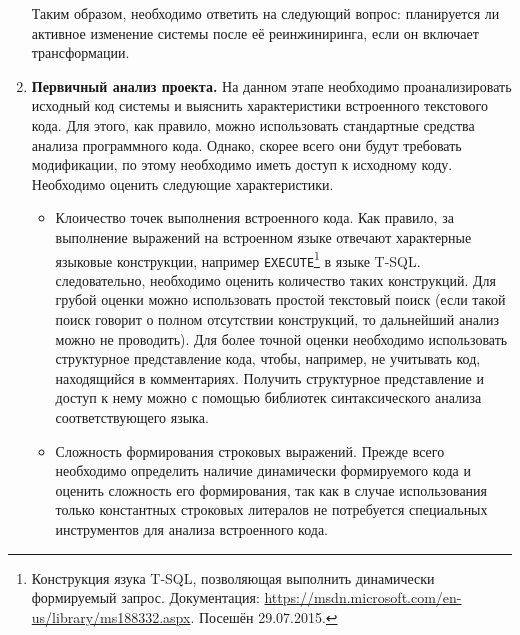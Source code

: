 \begin{enumerate}
  Таким образом, необходимо ответить на следующий вопрос: планируется ли активное изменение системы после её реинжиниринга, если он включает трансформации.
  
  \item \textbf{Первичный анализ проекта.} На данном этапе необходимо проанализировать исходный код системы и выяснить характеристики встроенного текстового кода. Для этого, как правило, можно использовать стандартные средства анализа программного кода. Однако, скорее всего они будут требовать модификации, по этому необходимо иметь доступ к исходному коду. Необходимо оценить следующие характеристики.
  \begin{itemize}
    \item Клоичество точек выполнения встроенного кода. Как правило, за выполнение выражений на встроенном языке отвечают характерные языковые конструкции, например \verb|EXECUTE|\footnote{Конструкция язука T-SQL, позволяющая выполнить динамически формируемый запрос. Документация: \url{https://msdn.microsoft.com/en-us/library/ms188332.aspx}. Посешён 29.07.2015.} в языке T-SQL. следовательно, необходимо оценить количество таких конструкций. Для грубой оценки можно использовать простой текстовый поиск (если такой поиск говорит о полном отсутствии конструкций, то дальнейший анализ можно не проводить). Для более точной оценки необходимо использовать структурное представление кода, чтобы, например, не учитывать код, находящийся в комментариях. Получить структурное представление и доступ к нему можно с помощью библиотек синтаксического анализа соответствующего языка.
    
    \item Сложность формирования строковых выражений. Прежде всего необходимо определить наличие динамически формируемого кода и оценить сложность его формирования, так как в случае использования только константных строковых литералов не потребуется специальных инструментов для анализа встроенного кода.
    

\end{itemize}
\end{enumerate}
